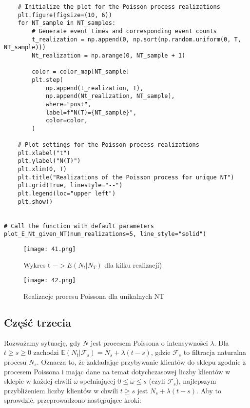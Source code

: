 \documentclass[12pt,letterpaper]{article}
\theoremstyle{definition}
\begin{document}
\begin{lstlisting}
    # Initialize the plot for the Poisson process realizations
    plt.figure(figsize=(10, 6))
    for NT_sample in NT_samples:
        # Generate event times and corresponding event counts
        t_realization = np.append(0, np.sort(np.random.uniform(0, T, NT_sample)))
        Nt_realization = np.arange(0, NT_sample + 1)

        color = color_map[NT_sample]
        plt.step(
            np.append(t_realization, T),
            np.append(Nt_realization, NT_sample),
            where="post",
            label=f"N(T)={NT_sample}",
            color=color,
        )

    # Plot settings for the Poisson process realizations
    plt.xlabel("t")
    plt.ylabel("N(T)")
    plt.xlim(0, T)
    plt.title("Realizations of the Poisson process for unique NT")
    plt.grid(True, linestyle="--")
    plt.legend(loc="upper left")
    plt.show()


# Call the function with default parameters
plot_E_Nt_given_NT(num_realizations=5, line_style="solid")

\end{lstlisting}
\begin{figure}[H]
    \centering
    \texttt{[image: 41.png]} 


    \caption{Wykres t $-> E(N_t|N_T)$ dla kilku realizacji)}

\end{figure}

\begin{figure}[H]
    \centering
    \texttt{[image: 42.png]} 


    \caption{Realizacje procesu Poissona dla unikalnych NT}

\end{figure}
\subsection{Część trzecia}

Rozważamy sytuację, gdy \( N \) jest procesem Poissona o intensywności \( \lambda \). Dla \( t \geq s \geq 0 \) zachodzi \( \mathbb{E}(N_t | \mathcal{F}_s) = N_s + \lambda (t - s) \), gdzie \( \mathcal{F}_s \) to filtracja naturalna procesu \( N_s \). Oznacza to, że zakładając przybywanie klientów do sklepu zgodnie z procesem Poissona i mając dane na temat dotychczasowej liczby klientów w sklepie w każdej chwili \( \omega \) spełniającej \( 0 \leq \omega \leq s \) (czyli \( \mathcal{F}_s \)), najlepszym przybliżeniem liczby klientów w chwili \( t \geq s \) jest \( N_s + \lambda (t - s) \). Aby to sprawdzić, przeprowadzono następujące kroki:
\end{document}
